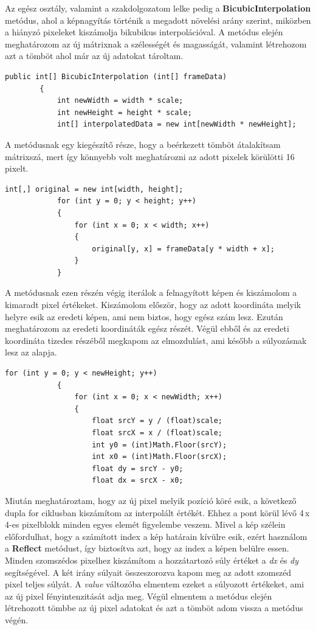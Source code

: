 \documentclass[]{thesis-ekf}
\theoremstyle{definition}
\theoremstyle{remark}
\begin{document}
	Az egész osztály, valamint a szakdolgozatom lelke pedig a \textbf{BicubicInterpolation} metódus, ahol a képnagyítás történik a megadott növelési arány szerint, miközben a hiányzó pixeleket kiszámolja bikubikus interpolációval. A metódus elején meghatározom az új mátrixnak a szélességét és magasságát, valamint létrehozom azt a tömböt ahol már az új adatokat tároltam.
	\begin{lstlisting}[language=CSharp]
		public int[] BicubicInterpolation (int[] frameData)
		{
			int newWidth = width * scale;
			int newHeight = height * scale;
			int[] interpolatedData = new int[newWidth * newHeight];
		\end{lstlisting}
		A metódusnak egy kiegészítő része, hogy a beérkezett tömböt átalakítsam mátrixszá, mert így könnyebb volt meghatározni az adott pixelek körülötti 16 pixelt. 
		\begin{lstlisting}[language=CSharp]
			int[,] original = new int[width, height];
			for (int y = 0; y < height; y++)
			{
				for (int x = 0; x < width; x++)
				{
					original[y, x] = frameData[y * width + x];
				}
			}
		\end{lstlisting}
		A metódusnak ezen részén végig iterálok a felnagyított képen és kiszámolom a kimaradt pixel értékeket. Kiszámolom először, hogy az adott koordináta melyik helyre esik az eredeti képen, ami nem biztos, hogy egész szám lesz. Ezután meghatározom az eredeti koordináták egész részét. Végül ebből és az eredeti koordináta tizedes részéből megkapom az elmozdulást, ami később a súlyozásnak lesz az alapja. 
		\begin{lstlisting}[language=CSharp]
			for (int y = 0; y < newHeight; y++)
			{
				for (int x = 0; x < newWidth; x++)
				{
					float srcY = y / (float)scale;
					float srcX = x / (float)scale;
					int y0 = (int)Math.Floor(srcY);
					int x0 = (int)Math.Floor(srcX);
					float dy = srcY - y0;
					float dx = srcX - x0;
				\end{lstlisting}
				Miután meghatároztam, hogy az új pixel melyik pozíció köré esik, a következő dupla for ciklusban kiszámítom az interpolált értékét. Ehhez a pont körül lévő 4\,x\,4-es pixelblokk minden egyes elemét figyelembe veszem. Mivel a kép szélein előfordulhat, hogy a számított index a kép határain kívülre esik, ezért használom a \textbf{Reflect} metódust, így biztosítva azt, hogy az index a képen belülre essen. Minden szomszédos pixelhez kiszámítom a hozzátartozó súly értéket a \emph{dx} és \emph{dy} segítségével. A két irány súlyait összeszorozva kapom meg az adott szomszéd pixel teljes súlyát. A \emph{value} változóba elmentem ezeket a súlyozott értékeket, ami az új pixel fényintenzitását adja meg. Végül elmentem a metódus elején létrehozott tömbbe az új pixel adatokat és azt a tömböt adom vissza a metódus végén.
\end{document}
